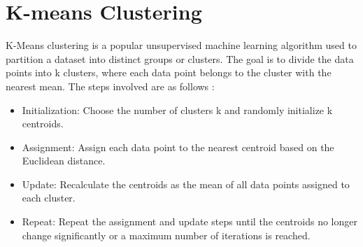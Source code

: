 \documentclass[10pt,a4paper]{style}
\begin{document}
	\section{K-means Clustering}
		K-Means clustering is a popular unsupervised machine learning algorithm used to partition a dataset into distinct groups or clusters. The goal is to divide the data points into k clusters, where each data point belongs to the cluster with the nearest mean. The steps involved are as follows : 
		\begin{itemize}
			\item Initialization: Choose the number of clusters k and randomly initialize k centroids.
			
			\item Assignment: Assign each data point to the nearest centroid based on the Euclidean distance.
			
			\item Update: Recalculate the centroids as the mean of all data points assigned to each cluster.
			
			\item Repeat: Repeat the assignment and update steps until the centroids no longer change significantly or a maximum number of iterations is reached.
		\end{itemize}
		
\end{document}
